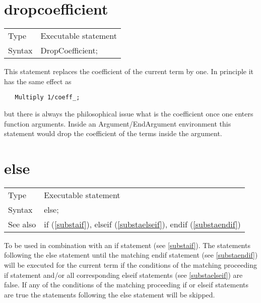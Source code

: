 
\section{dropcoefficient}
\label{substadropcoefficient}

\noindent \begin{tabular}{ll}
Type & Executable statement\\
Syntax & DropCoefficient;
\end{tabular} \vspace{4mm}

\noindent This statement replaces the coefficient of the current term by 
one. In principle it has the same effect as
\begin{verbatim}
   Multiply 1/coeff_;
\end{verbatim}
but there is always the philosophical issue what is the coefficient once 
one enters function arguments. Inside an 
Argument/EndArgument environment this 
statement would drop the coefficient of the terms inside the argument.
\vspace{10mm}


\section{else}
\label{substaelse}

\noindent \begin{tabular}{ll}
Type & Executable statement\\
Syntax & else;
\\ See also & if (\ref{substaif}),
              elseif (\ref{substaelseif}),
              endif (\ref{substaendif})
\end{tabular} \vspace{4mm}

\noindent To be used in combination with an if statement (see 
\ref{substaif}). The statements following the
else statement until the matching 
endif 
statement (see \ref{substaendif}) will be executed for the current term if 
the conditions of the matching proceeding if 
statement and/or all corresponding elseif statements (see 
\ref{substaelseif}) are false. If any of the conditions of the matching 
proceeding if or elseif statements are true the statements following the 
else statement will be skipped. \vspace{10mm}


